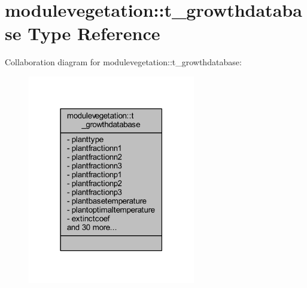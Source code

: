 \hypertarget{structmodulevegetation_1_1t__growthdatabase}{}\section{modulevegetation\+:\+:t\+\_\+growthdatabase Type Reference}
\label{structmodulevegetation_1_1t__growthdatabase}


Collaboration diagram for modulevegetation\+:\+:t\+\_\+growthdatabase\+:\nopagebreak
\begin{figure}[H]
\begin{center}
\leavevmode
\includegraphics[width=207pt]{structmodulevegetation_1_1t__growthdatabase__coll__graph}
\end{center}
\end{figure}
